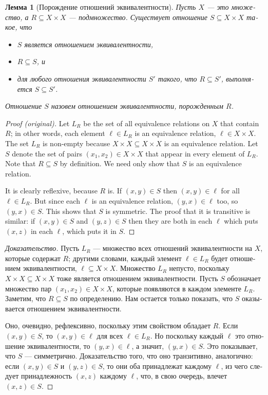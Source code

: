 \documentclass[a4paper]{book}
\def\ss{\subseteq}
\theoremstyle{myth}
\newenvironment{proofENG}{\begin{proof}[Proof (original)]}{\end{proof}}
\newtheorem{lemmaRUS}[envRUS]{Лемма}
\newenvironment{proofRUS}{\begin{proof}[Доказательство]}{\end{proof}}
\begin{document}
\begin{russian}
\begin{lemmaRUS}[Порождение отношений эквивалентности]\label{lemma:generating ERs}
Пусть $X$ — это множество, а $R\ss X\times X$ — подмножество. Существует отношение $S\ss X\times X$ такое, что
\begin{itemize}
\item $S$ является отношением эквивалентности,
\item $R\ss S$, и
\item для любого отношения эквивалентности $S'$ такого, что $R\ss S'$, выполняется $S\ss S'$.
\end{itemize}
Отношение $S$ назовем {\em отношением эквивалентности, порожденным $R$}.
\end{lemmaRUS}

\begin{proofENG}
Let $L_R$ be the set of all equivalence relations on $X$ that contain $R$; in other words, each element $\ell\in L_R$ is an equivalence relation, $\ell\in X\times X$. The set $L_R$ is non-empty because $X\times X\ss X\times X$ is an equivalence relation. Let $S$ denote the set of pairs $(x_1,x_2)\in X\times X$ that appear in every element of $L_R$. Note that $R\ss S$ by definition. We need only show that $S$ is an equivalence relation.

It is clearly reflexive, because $R$ is. If $(x,y)\in S$ then $(x,y)\in\ell$ for all $\ell\in L_R$. But since each $\ell$ is an equivalence relation, $(y,x)\in\ell$ too, so $(y,x)\in S$. This shows that $S$ is symmetric. The proof that it is transitive is similar: if $(x,y)\in S$ and $(y,z)\in S$ then they are both in each $\ell$ which puts $(x,z)$ in each $\ell$, which puts it in $S$.
\end{proofENG}

\begin{proofRUS}
Пусть $L_R$ — множество всех отношений эквивалентности на $X$, которые содержат $R$; другими словами, каждый элемент $\ell\in L_R$ будет отношением эквивалентности, $\ell\ss X\times X$. Множество $L_R$ непусто, поскольку $X\times X\ss X\times X$ тоже является отношением эквивалентности. Пусть $S$ обозначает множество пар $(x_1,x_2)\in X\times X$, которые появляются в каждом элементе $L_R$. Заметим, что $R\ss S$ по определению. Нам остается только показать, что $S$ оказывается отношением эквивалентности.

Оно, очевидно, рефлексивно, поскольку этим свойством обладает $R$. Если $(x,y)\in S$, то $(x,y)\in\ell$ для всех $\ell\in L_R$. Но поскольку каждый $\ell$ это отношение эквивалентности, то $(y,x)\in\ell$, а значит, $(y,x)\in S$. Это показывает, что $S$ — симметрично. Доказательство того, что оно транзитивно, аналогично: если $(x,y)\in S$ и $(y,z)\in S$, то они оба принадлежат каждому $\ell$, из чего следует принадлежность $(x,z)$ каждому $\ell$, что, в свою очередь, влечет $(x,z)\in S$.
\end{proofRUS}


\end{russian}
\end{document}
